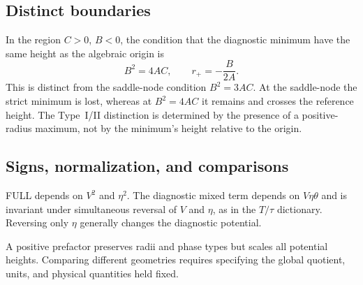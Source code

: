 \subsection{Distinct boundaries}
In the region $C>0$, $B<0$, the condition that the diagnostic minimum
have the same height as the algebraic origin is
\begin{equation}
B^2=4AC,\qquad r_+=-\frac{B}{2A}.
\tag{M5-05}\label{eq:M5-05}
\end{equation}
This is distinct from the saddle-node condition $B^2=3AC$.
At the saddle-node the strict minimum is lost, whereas at $B^2=4AC$
it remains and crosses the reference height.
The Type~I/II distinction is determined by the presence of a
positive-radius maximum, not by the minimum's height relative to the origin.

\subsection{Signs, normalization, and comparisons}
FULL depends on $V^2$ and $\eta^2$.
The diagnostic mixed term depends on $V\eta\theta$ and is invariant under
simultaneous reversal of $V$ and $\eta$, as in the $T/\tau$ dictionary.
Reversing only $\eta$ generally changes the diagnostic potential.

A positive prefactor preserves radii and phase types but scales all
potential heights. Comparing different geometries requires specifying
the global quotient, units, and physical quantities held fixed.
